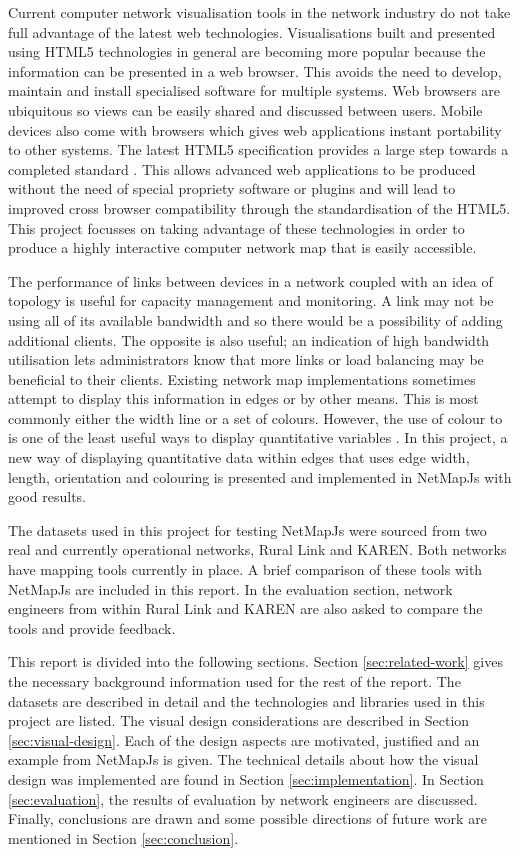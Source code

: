 \documentclass[11pt, a4paper]{article}
\begin{document}
Current computer network visualisation tools in the network industry do not take
full advantage of the latest web technologies. Visualisations built and
presented using HTML5 technologies in general are becoming more popular because
the information can be presented in a web browser. This avoids the need to
develop, maintain and install specialised software for multiple systems. Web
browsers are ubiquitous so views can be easily shared and discussed between
users. Mobile devices also come with browsers which gives web applications
instant portability to other systems. The latest HTML5 specification provides a
large step towards a completed standard \cite{HTML5_website}. This allows
advanced web applications to be produced without the need of special propriety
software or plugins and will lead to improved cross browser compatibility
through the standardisation of the HTML5. This project focusses on taking
advantage of these technologies in order to produce a highly interactive
computer network map that is easily accessible.

The performance of links between devices in a network coupled with an idea of
topology is useful for capacity management and monitoring. A link may not be
using all of its available bandwidth and so there would be a possibility of
adding additional clients. The opposite is also useful; an indication of high
bandwidth utilisation lets administrators know that more links or load balancing
may be beneficial to their clients. Existing network map implementations
sometimes attempt to display this information in edges or by other means. This
is most commonly either the width line or a set of colours. However, the use of
colour to is one of the least useful ways to display quantitative variables
\cite{Spence_2007}. In this project, a new way of displaying quantitative data
within edges that uses edge width, length, orientation and colouring is
presented and implemented in NetMapJs with good results.


The datasets used in this project for testing NetMapJs were sourced from two
real and currently operational networks, Rural Link and KAREN. Both networks
have mapping tools currently in place. A brief comparison of these tools with
NetMapJs are included in this report. In the evaluation section, network
engineers from within Rural Link and KAREN are also asked to compare the tools
and provide feedback. 

This report is divided into the following sections. Section
\ref{sec:related-work} gives the necessary background information used for the
rest of the report. The datasets are described in detail and the technologies
and libraries used in this project are listed. The visual design considerations
are described in Section \ref{sec:visual-design}. Each of the design aspects are
motivated, justified and an example from NetMapJs is given. The technical
details about how the visual design was implemented are found in Section
\ref{sec:implementation}. In Section \ref{sec:evaluation}, the results of
evaluation by network engineers are discussed. Finally, conclusions are drawn
and some possible directions of future work are mentioned in Section
\ref{sec:conclusion}.
\end{document}
